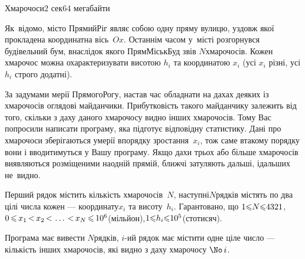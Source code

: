\vspace{10mm}\par
\begin{problem}{Хмарочоси}{\stdinOrInputTxt}{\stdoutOrOutputTxt}{2 сек}{64 мегабайти}

Як~відомо, місто Прямий\nolinebreak[2] Ріг являє собою одну пряму вулицю, уздовж якої прокладена координатна вісь~$Ox$. Останнім часом у~місті розгорнувся будівельний бум, внаслідок якого ПрямМіськБуд звів $N$\nolinebreak[3] хмарочосів. Кожен хмарочос можна охарактеризувати висотою $h_i$ та координатою $x_i$ (усі $x_i$ різні, усі $h_i$ строго додатні).

За задумами мерії Прямого\nolinebreak[2] Рогу, настав час обладнати на дахах деяких із хмарочосів оглядові майданчики. Прибутковість такого майданчику залежить від того, скільки з даху даного хмарочосу видно інших хмарочосів. Тому Вас попросили написати програму, яка підготує відповідну статистику. Дані про хмарочоси зберігаються у\nolinebreak[3] мерії в\nolinebreak[3] порядку зростання~$x_i$, тож саме в\nolinebreak[3] такому порядку вони і вводитимуться у Вашу програму. Якщо дахи трьох або більше хмарочосів виявляються розміщеними на\nolinebreak[2] одній прямій, ближчі затуляють дальші, і\nolinebreak[3] дальших не~видно.

\InputFile
Перший рядок містить кількість хмарочосів~$N$, наступні\nolinebreak[2] $N$\nolinebreak[3] рядків містять по два цілі числа кожен --- координату\nolinebreak[3] $x_i$ та висоту~$h_i$. Гарантовано, що ${1{\leqslant}N{\leqslant}4321}$, $0\dib{{\<}}x_1\dib{{<}}x_2\dib{{<}}\dots\dib{{<}}x_N\dib{{\<}}10^6$\nolinebreak[3] (мільйон),\linebreak[2] ${1{\leqslant}h_i{\leqslant}10^5}$\nolinebreak[2] (сто\nolinebreak[3] тисяч). 

\OutputFile
Програма має вивести $N$\nolinebreak[3] рядків, $i$-ий рядок має містити одне ціле число --- кількість інших хмарочосів, які видно з даху хмарочосу $\No\,i$.

\begin{minipage}{\textwidth}

\Example

\vspace{-\baselineskip}


\end{minipage}
\end{problem}
